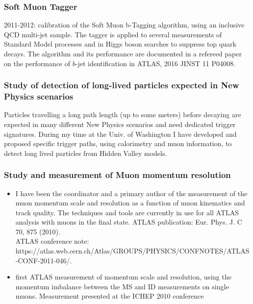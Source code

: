 \documentclass{article}
\begin{document}
\begin{vita}
\subsubsection*{Soft Muon Tagger}
2011-2012: calibration of the Soft Muon b-Tagging algorithm, using an inclusive QCD multi-jet sample. The tagger is applied to several measurements of Standard Model processes and in Higgs boson searches to suppress top quark decays. The algorithm and its performance are documented in a refereed paper on the performance of $b$-jet identification in ATLAS, 2016 JINST 11 P04008.

\subsubsection*{Study of detection of long-lived particles expected in New Physics scenarios} 
Particles travelling a long path length (up to some meters) before decaying are expected in many different New Physics
scenarios and need dedicated trigger signatures. During my time at the Univ. of Washington I have developed and proposed specific trigger paths, using calorimetry and muon information, to detect long lived particles from Hidden Valley models.

\subsubsection*{Study and measurement of Muon momentum resolution}
\begin{itemize}
\item I have been the coordinator and a primary author of the measurement of the muon momentum scale and resolution as a function of muon kinematics and track quality. The techniques and tools are currently in use for all ATLAS analysis with muons in the final state. ATLAS publication: Eur. Phys. J. C 70, 875 (2010). \\ ATLAS conference note: https://atlas.web.cern.ch/Atlas/GROUPS/PHYSICS/CONFNOTES/ATLAS-CONF-2011-046/. 
\item first ATLAS measurement of momentum scale and resolution, using the momentum imbalance between the MS and ID measurements on single muons. Measurement presented at the ICHEP 2010 conference
\end{itemize}


\end{vita}
\end{document}
